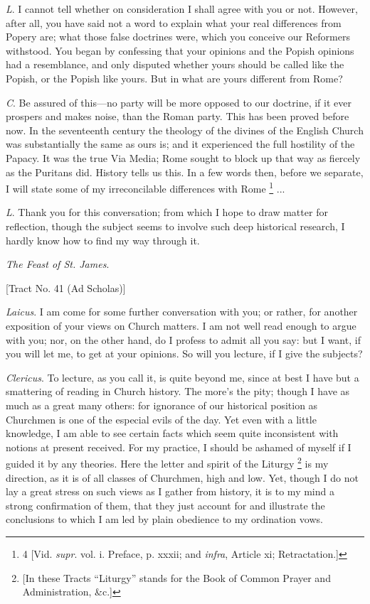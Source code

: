 \emph{L}. I cannot tell whether on consideration
I shall agree with you or not. However, after all, you have said not a
word to explain what your real differences from Popery are; what those
false doctrines were, which you conceive our Reformers withstood. You
began by confessing that your opinions and the Popish opinions had a
resemblance, and only disputed whether yours should be called like the
Popish, or the Popish like yours. But in what are yours different from
Rome?

\emph{C}. Be assured of this—no party will be
more opposed to our doctrine, if it ever prospers and makes noise,
than the Roman party. This has been proved before now. In the
seventeenth century the theology of the divines of the English Church
was substantially the same as ours is; and it experienced the full
hostility of the Papacy. It was the true Via Media; Rome sought to
block up that way as fiercely as the Puritans did. History tells us
this. In a few words then, before we separate, I will state some of my
irreconcilable differences with Rome \footnote{4
[Vid. \emph{supr}. vol. i. Preface, p. xxxii; and \emph{infra},
Article xi; Retractation.]} ...

\emph{L}. Thank you for this conversation; from
which I hope to draw matter for reflection, though the subject seems
to involve such deep historical research, I hardly know how to find my
way through it.

\emph{The Feast of St. James}.

[Tract No. 41
(Ad Scholas)]


\emph{Laicus}. I am come for some further
conversation with you; or rather, for another exposition of your views
on Church matters. I am not well read enough to argue with you; nor,
on the other hand, do I profess to admit all you say: but I want, if
you will let me, to get at your opinions. So will you lecture, if I
give the subjects?

\emph{Clericus}. To lecture, as you call it, is
quite beyond me, since at best I have but a smattering of reading in
Church history. The more's the pity; though I have as much as a great
many others: for ignorance of our historical position as Churchmen is
one of the especial evils of the day. Yet even with a little
knowledge, I am able to see certain facts which seem quite
inconsistent with notions at present received. For my practice, I
should be ashamed of myself if I guided it by any theories. Here the
letter and spirit of the Liturgy \footnote{[In these Tracts ``Liturgy'' stands for the Book of Common Prayer and
Administration, \&c.]} is my direction, as it is of all classes of Churchmen, high and
low. Yet, though I do not lay a great stress on such views as I gather
from history, it is to my mind a strong confirmation of them, that
they just account for and illustrate the conclusions to which I am led
by plain obedience to my ordination vows.

